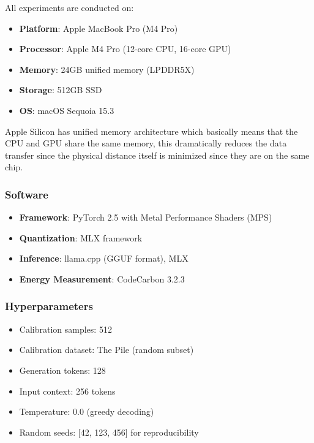 \documentclass[conference]{IEEEtran}
\begin{document}
All experiments are conducted on:
\begin{itemize}[leftmargin=*,nosep]
    \item \textbf{Platform}: Apple MacBook Pro (M4 Pro)
    \item \textbf{Processor}: Apple M4 Pro (12-core CPU, 16-core GPU)
    \item \textbf{Memory}: 24GB unified memory (LPDDR5X)
    \item \textbf{Storage}: 512GB SSD
    \item \textbf{OS}: macOS Sequoia 15.3
\end{itemize}

Apple Silicon has unified memory architecture which basically means that the CPU and GPU share the same memory, this dramatically reduces the data transfer since the physical distance itself is minimized since they are on the same chip.

\subsubsection{Software}

\begin{itemize}[leftmargin=*,nosep]
    \item \textbf{Framework}: PyTorch 2.5 with Metal Performance Shaders (MPS)
    \item \textbf{Quantization}: MLX framework
    \item \textbf{Inference}: llama.cpp (GGUF format), MLX
    \item \textbf{Energy Measurement}: CodeCarbon 3.2.3
\end{itemize}

\subsubsection{Hyperparameters}

\begin{itemize}[leftmargin=*,nosep]
    \item Calibration samples: 512
    \item Calibration dataset: The Pile (random subset)
    \item Generation tokens: 128
    \item Input context: 256 tokens
    \item Temperature: 0.0 (greedy decoding)
    \item Random seeds: [42, 123, 456] for reproducibility
\end{itemize}
\end{document}

